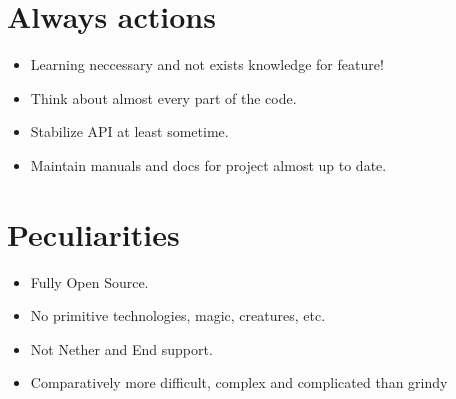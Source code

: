 \documentclass[12pt]{article}
\begin{document}
	\section{Always actions}

	\begin{itemize}
		\item Learning neccessary and not exists knowledge for feature!
		\item Think about almost every part of the code.
		\item Stabilize API at least sometime.
		\item Maintain manuals and docs for project almost up to date.
	\end{itemize}

	\section{Peculiarities}

	\begin{itemize}
		\item Fully Open Source.
		\item No primitive technologies, magic, creatures, etc.
		\item Not Nether and End support.
		\item Comparatively more difficult, complex and complicated than grindy
	\end{itemize}
\end{document}
